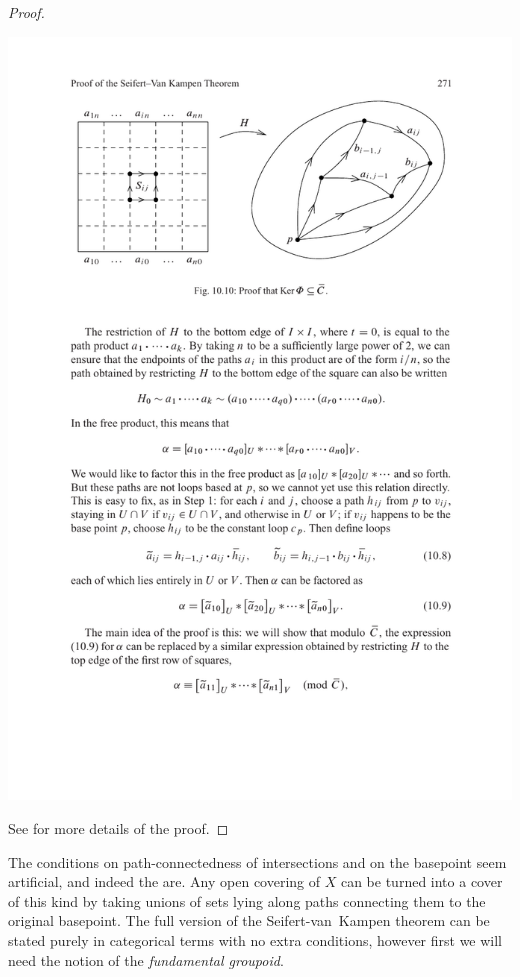 \begin{proof}
    \begin{center}
        \includegraphics[scale=1]{figures/kernel of Phi.pdf}
    \end{center}
    
    See \cite[Theorem 1.20]{Hatcher} for more details of the proof.
\end{proof}

The conditions on path-connectedness of intersections and on the basepoint seem artificial, and indeed the are. Any open covering of $X$ can be turned into a cover of this kind by taking unions of sets lying along paths connecting them to the original basepoint. The full version of the Seifert-van~Kampen theorem can be stated purely in categorical terms with no extra conditions, however first we will need the notion of the \emph{fundamental groupoid}.

